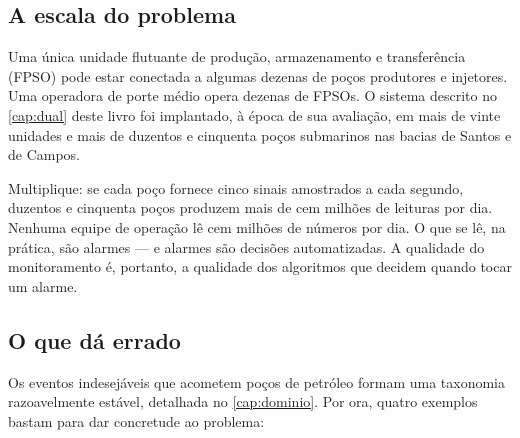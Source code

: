 \subsection{A escala do problema}

Uma única unidade flutuante de produção, armazenamento e transferência (FPSO) pode
estar conectada a algumas dezenas de poços produtores e injetores. Uma operadora de
porte médio opera dezenas de FPSOs. O sistema descrito no \cref{cap:dual} deste livro
foi implantado, à época de sua avaliação, em mais de vinte unidades e mais de duzentos
e cinquenta poços submarinos nas bacias de Santos e de Campos.

Multiplique: se cada poço fornece cinco sinais amostrados a cada segundo, duzentos e
cinquenta poços produzem mais de cem milhões de leituras por dia. Nenhuma equipe de
operação lê cem milhões de números por dia. O que se lê, na prática, são alarmes --- e
alarmes são decisões automatizadas. A qualidade do monitoramento é, portanto, a
qualidade dos algoritmos que decidem quando tocar um alarme.

\subsection{O que dá errado}
\label{sec:introducao-oquedaerrado}

Os eventos indesejáveis que acometem poços de petróleo formam uma taxonomia razoavelmente
estável, detalhada no \cref{cap:dominio}. Por ora, quatro exemplos bastam para dar
concretude ao problema:

